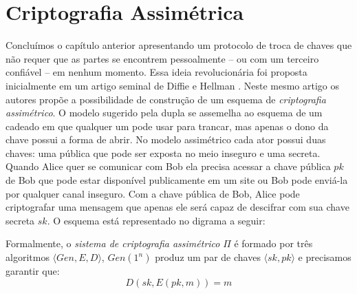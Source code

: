 \chapter{Criptografia Assimétrica}
\label{cha:criptografia-assimetrica}


Concluímos o capítulo anterior apresentando um protocolo de troca de chaves que não requer que as partes se encontrem pessoalmente -- ou com um terceiro confiável -- em nenhum momento.
Essa ideia revolucionária foi proposta inicialmente em um artigo seminal de Diffie e Hellman \cite{Diffie76}.
Neste mesmo artigo os autores propõe a possibilidade de construção de um esquema de {\em criptografia assimétrico}.
O modelo sugerido pela dupla se assemelha ao esquema de um cadeado em que qualquer um pode usar para trancar, mas apenas o dono da chave possui a forma de abrir.
No modelo assimétrico cada ator possui duas chaves: uma pública que pode ser exposta no meio inseguro e uma secreta.
Quando Alice quer se comunicar com Bob ela precisa acessar a chave pública $pk$ de Bob que pode estar disponível publicamente em um site ou Bob pode enviá-la por qualquer canal inseguro.
Com a chave pública de Bob, Alice pode criptografar uma mensagem que apenas ele será capaz de descifrar com sua chave secreta $sk$.
O esquema está representado no digrama a seguir:

\begin{center}
\end{center}

Formalmente, o {\em sistema de criptografia assimétrico} $\Pi$ é formado por três algoritmos $\langle Gen, E, D \rangle$, $Gen(1^n)$ produz um par de chaves $\langle sk, pk \rangle$ e precisamos garantir que:
\begin{displaymath}
  D(sk, E(pk, m)) = m
\end{displaymath}

